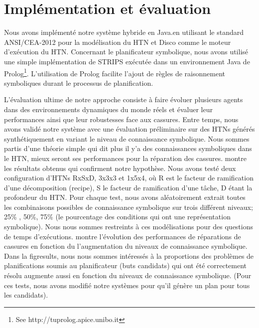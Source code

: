 \documentclass[a4paper,twoside,french]{article}
\begin{document}
	\section{Implémentation et évaluation}
	Nous avons implémenté notre système hybride en Java.en utilisant le standard ANSI/CEA-2012 \cite{rich2009building} pour la modélisation du HTN et Disco \cite{rich2012using} comme le moteur d'exécution du HTN. Concernant le planificateur symbolique, nous avons utilisé une simple implémentation de STRIPS  exécutée dans un environnement Java de Prolog\footnote{See http://tuprolog.apice.unibo.it}. L'utilisation de Prolog facilite l'ajout de règles de raisonnement symboliques durant le processus de planification. 
	\par L'évaluation ultime de notre approche consiste à faire évoluer plusieurs agents dans des environnements dynamiques du monde réels et évaluer leur performances ainsi que leur robustesses face aux cassures. Entre temps, nous avons validé notre système avec une évaluation préliminaire sur des HTNs générés synthétiquement en variant le niveau de connaissance symbolique. Nous sommes partis d'une théorie simple qui dit plus il y'a des connaissances symboliques dans le HTN, mieux seront ses performances pour la réparation des cassures. 
		 montre les résultats obtenus qui confirment notre hypothèse. Nous avons testé deux configuration d'HTNs RxSxD, 3x3x3 et 1x5x4, où R est le facteur de ramification d'une décomposition (recipe), S le facteur de ramification d'une tâche, D étant la profondeur du HTN.  Pour chaque test, nous avons aléatoirement extrait toutes les combinaisons possibles de connaissance symbolique sur trois différent niveaux; 25\% , 50\%, 75\% (le pourcentage des conditions qui ont une représentation symbolique). Nous nous sommes restreints à ces modélisations pour des questions de temps d'exécutions. 	 montre l'évolution des performances de réparations de cassures en fonction du l'augmentation du niveaux de connaissance symbolique. Dans la fig{results}, nous nous sommes intéressés à la proportions des problèmes de planifications soumis au planificateur (buts candidats) qui ont été correctement résolu augmente aussi en fonction du niveaux de connaissance symbolique. (Pour ces tests, nous avons modifié notre systèmes pour qu'il génère un plan pour tous les candidats).
\end{document}
